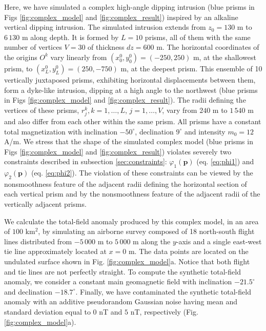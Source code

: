 Here, we have simulated a complex high-angle dipping intrusion (blue prisms in Figs \ref{fig:complex_model} and \ref{fig:complex_result}) inspired by an alkaline vertical dipping intrusion. 
The simulated intrusion extends from $z_0=130$ m to $6\,130$ m along depth.
It is formed by $ L = 10 $ prisms, all of them with the same number of vertices $ V = 30 $ of thickness $ dz = 600 $ m. 
The horizontal coordinates of the origins $ O^k $ vary linearly from $ (x_0^0, y_0^0) = (-250, 250) $ m, at the shallowest prism, to $ (x_L^0, y_L^0) = (250, -750) $ m, at the deepest prism. 
This ensemble of 10 vertically juxtaposed prisms, exhibiting horizontal displacements between them, form a dyke-like intrusion, dipping at a high angle to the northwest (blue prisms in Figs \ref{fig:complex_model} and \ref{fig:complex_result}). 
The radii defining the vertices of these prisms, $ r^k_j, k = 1, \dots, L$, $j = 1,\dots, V$, 
vary from $ 240 $ m to $ 1\,540 $ m and also differ from each other within the same prism. 
All prisms have a constant total magnetization with inclination $ -50^\circ $, declination $ 9^\circ $ and intensity $ m_0 = 12 $ A/m. 
We stress that the shape of the simulated complex model (blue prisms in Figs \ref{fig:complex_model} and \ref{fig:complex_result}) violates severely two constraints described in subsection \ref{sec:constraints}: $\varphi_{1}(\mathbf{p})$ (eq. \ref{eq:phi1})
and $\varphi_{2}(\mathbf{p})$ (eq. \ref{eq:phi2}).
The violation of these constraints can be viewed by the nonsmoothness feature of the adjacent radii defining the horizontal section of each vertical prism and by the nonsmoothness feature of the adjacent radii of the vertically adjacent prisms.

We calculate the total-field anomaly produced by this complex model, in an area of $ 100 $ km$^2 $, by simulating an airborne survey composed of 18 north-south flight lines distributed from $ -5\,000 $ m to $ 5\,000 $ m along the $ y $-axis and a single east-west tie line approximately located at $ x = 0 $ m. 
The data points are located on the undulated surface shown in Fig. \ref{fig:complex_model}a. Notice that both flight and tie lines are not perfectly straight. 
To compute the synthetic total-field anomaly, we consider a constant main geomagnetic field with inclination $ -21.5^\circ $ and declination $ -18.7^\circ $. 
Finally, we have contaminated the synthetic total-field anomaly with an additive pseudorandom Gaussian noise having mean and standard deviation equal to $0$ nT and $5$ nT, respectively (Fig. \ref{fig:complex_model}a).

